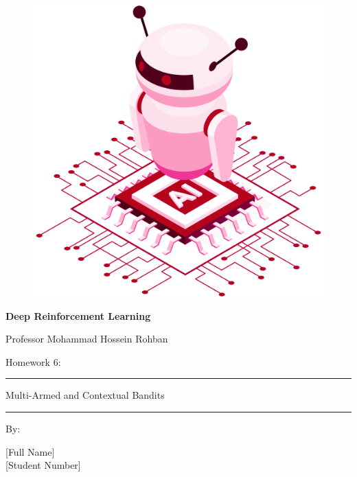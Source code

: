 \documentclass[12pt]{article}
\begin{document}
\thispagestyle{plain}

\begin{center}

\vspace*{-1.5cm}
\begin{figure}[!h]
    \centering
    \includegraphics[width=0.7\linewidth]{figs/cover-std.png}
\end{figure}

{

{\color{DarkBlue} {\fontsize{30}{50} \textbf{
Deep Reinforcement Learning
}}}

{\color{DarkBlue} {\Large
Professor Mohammad Hossein Rohban
}}
}


\vspace{20pt}

{


{\color{RedOrange}
{\Large
Homework 6:
}\\
}
{\color{BrickRed}
\rule{12cm}{0.5pt}

{\Huge
Multi-Armed and Contextual Bandits
}
\rule{12cm}{0.5pt}
}

\vspace{10pt}

{\color{RoyalPurple} { \small By:} } \\
\vspace{10pt}

{\color{Blue} { \LARGE [Full Name] } } \\
\vspace{5pt}
{\color{RoyalBlue} { \Large [Student Number] } }


}
\end{center}
\end{document}
